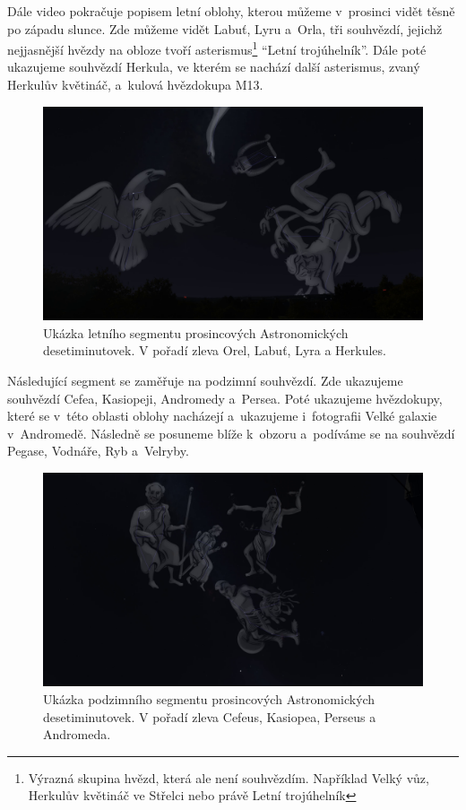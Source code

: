 \documentclass[12pt,a4paper,titlepage]{article}
\begin{document}
Dále video pokračuje popisem letní oblohy, kterou můžeme v~prosinci vidět těsně po západu slunce. Zde můžeme vidět Labuť, Lyru a~Orla, tři souhvězdí, jejichž nejjasnější hvězdy na obloze tvoří asterismus\footnote{Výrazná skupina hvězd, která ale není souhvězdím. Například Velký vůz, Herkulův květináč ve Střelci nebo právě Letní trojúhelník} \enquote{Letní trojúhelník}. Dále poté ukazujeme souhvězdí Herkula, ve kterém se nachází další asterismus, zvaný Herkulův květináč, a~kulová hvězdokupa M13.

\begin{figure}[H]
	\centering
	\includegraphics[width=.95\textwidth]{ac12_leto.png}
	\caption{Ukázka letního segmentu prosincových Astronomických desetiminutovek. V pořadí zleva Orel, Labuť, Lyra a Herkules.}\label{prac:ac12_leto}
\end{figure}

Následující segment se zaměřuje na podzimní souhvězdí. Zde ukazujeme souhvězdí Cefea, Kasiopeji, Andromedy a~Persea. Poté ukazujeme hvězdokupy, které se v~této oblasti oblohy nacházejí a~ukazujeme i~fotografii Velké galaxie v~Andromedě. Následně se posuneme blíže k~obzoru a~podíváme se na souhvězdí Pegase, Vodnáře, Ryb a~Velryby. 

\begin{figure}[H]
	\centering
	\includegraphics[width=.95\textwidth]{ac12_podzim.png}
	\caption{Ukázka podzimního segmentu prosincových Astronomických desetiminutovek. V pořadí zleva Cefeus, Kasiopea, Perseus a Andromeda.}\label{prac:ac12_podzim}
\end{figure}
\end{document}
